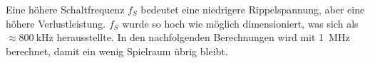 Eine h\"ohere Schaltfrequenz $f_S$ bedeutet eine niedrigere Rippelspannung, aber
eine h\"ohere Verlustleistung. $f_S$ wurde so hoch wie m\"oglich  dimensioniert,
was sich als $\approx \SI{800}{\kilo\hertz}$ herausstellte. In den nachfolgenden
Berechnungen  wird mit \SI{1}{\mega\hertz} berechnet, damit ein wenig  Spielraum
\"ubrig bleibt.
